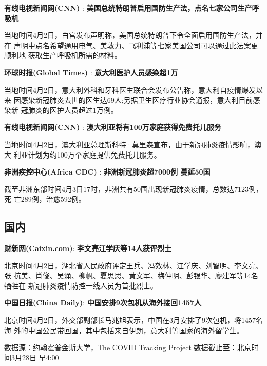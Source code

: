 \documentclass[
]{article}
\begin{document}
\textbf{\textcolor{glaucous}{有线电视新闻网(CNN)}} :
\textbf{美国总统特朗普启用国防生产法，点名七家公司生产呼吸机}

当地时间4月2日，白宫发布声明称，美国总统特朗普下令全面启用国防生产法，并在
声明中点名希望通用电气、美敦力、飞利浦等七家美国公司可以通过此法案更顺利地
获取生产呼吸机所需的材料。

\textbf{\textcolor{glaucous}{环球时报(Global Times)}} :
\textbf{意大利医护人员感染超1万}

当地时间4月2日，意大利外科和牙科医生联合会发布公告称，意大利自疫情爆发以来
因感染新冠肺炎去世的医生达69人;另据卫生医疗行业协会通报，意大利目前感染新
冠肺炎的医护人员超过1万例。

\textbf{\textcolor{glaucous}{有线电视新闻网(CNN)}} :
\textbf{澳大利亚将有100万家庭获得免费托儿服务}

当地时间4月2日，澳大利亚总理斯科特·莫里森宣布，由于新冠肺炎疫情影响，澳大
利亚计划为约100万个家庭提供免费托儿服务。

\textbf{\textcolor{glaucous}{非洲疾控中心(Africa CDC)}} :
\textbf{非洲新冠肺炎超7000例 蔓延50国}

截至非洲东部时间4月3日17时，非洲共有50国出现新冠肺炎疫情，总数达7123例，死
亡289例，治愈592例。

\hypertarget{section-1}{%
\subsection{\texorpdfstring{\textcolor{glaucous}{\Large 国内}}{}}\label{section-1}}

\textbf{\textcolor{glaucous}{财新网(Caixin.com)}}:
\textbf{李文亮江学庆等14人获评烈士}

北京时间4月2日，湖北省人民政府评定王兵、冯效林、江学庆、刘智明、李文亮、张
抗美、肖俊、吴涌、柳帆、夏思思、黄文军、梅仲明、彭银华、廖建军等14名牺牲在
新冠肺炎疫情防控一线人员为首批烈士。

\textbf{\textcolor{glaucous}{中国日报(China Daily)}}:
\textbf{中国安排9次包机从海外接回1457人}

北京时间4月2日，外交部副部长马兆旭表示，中国在3月安排了9次包机，将1457名海
外的中国公民带回国，其中包括来自伊朗，意大利等国家的海外留学生。

\newpage

%
  \noindent{}%

\begin{small}
{数据源：约翰霍普金斯大学，The COVID Tracking Project \quad   数据截止至：北京时间3月28日 早4:00}
\end{small}
\end{document}
